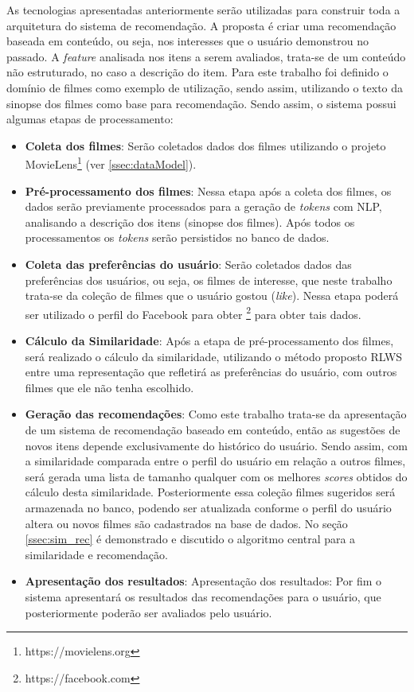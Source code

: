 As tecnologias apresentadas anteriormente serão utilizadas para construir toda a arquitetura do sistema de recomendação. A proposta é criar uma recomendação baseada em conteúdo, ou seja, nos interesses que o usuário demonstrou no passado. A \textit{feature} analisada nos itens a serem avaliados, trata-se de um conteúdo não estruturado, no caso a descrição do item. Para este trabalho foi definido o domínio de filmes como exemplo de utilização, sendo assim, utilizando o texto da sinopse dos filmes como base para recomendação. Sendo assim, o sistema possui algumas etapas de processamento:

\begin{itemize}
	\item{\textbf{Coleta dos filmes}: Serão coletados dados dos filmes utilizando o projeto MovieLens\footnote{https://movielens.org} (ver \ref{ssec:dataModel}).}
	
	\item{\textbf{Pré-processamento dos filmes}: Nessa etapa após a coleta dos filmes, os dados serão previamente processados para a geração de \textit{tokens} com \ac{NLP}, analisando a descrição dos itens (sinopse dos filmes). Após todos os processamentos os \textit{tokens} serão persistidos no banco de dados.}
	
	\item{\textbf{Coleta das preferências do usuário}: Serão coletados dados das preferências dos usuários, ou seja, os filmes de interesse, que neste trabalho trata-se da coleção de filmes que o usuário gostou (\textit{like}). Nessa etapa poderá ser utilizado o perfil do Facebook para obter \footnote{https://facebook.com} para obter tais dados.}

	\item{\textbf{Cálculo da Similaridade}: Após a etapa de pré-processamento dos filmes, será realizado o cálculo da similaridade, utilizando o método proposto \ac{RLWS} entre uma representação que refletirá as preferências do usuário, com outros filmes que ele não tenha escolhido.}
	
	\item{\textbf{Geração das recomendações}: Como este trabalho trata-se da apresentação de um sistema de recomendação baseado em conteúdo, então as sugestões de novos itens depende exclusivamente do histórico do usuário. Sendo assim, com a similaridade comparada entre o perfil do usuário em relação a outros filmes, será gerada uma lista de tamanho qualquer com os melhores \textit{scores} obtidos do cálculo desta similaridade. Posteriormente essa coleção filmes sugeridos será armazenada no banco, podendo ser atualizada conforme o perfil do usuário altera ou novos filmes são cadastrados na base de dados. No seção \ref{ssec:sim_rec} é demonstrado e discutido o algoritmo central para a similaridade e recomendação.}
	
	\item{\textbf{Apresentação dos resultados}: Apresentação dos resultados: Por fim o sistema apresentará os resultados das recomendações para o usuário, que posteriormente poderão ser avaliados pelo usuário.}
\end{itemize}

